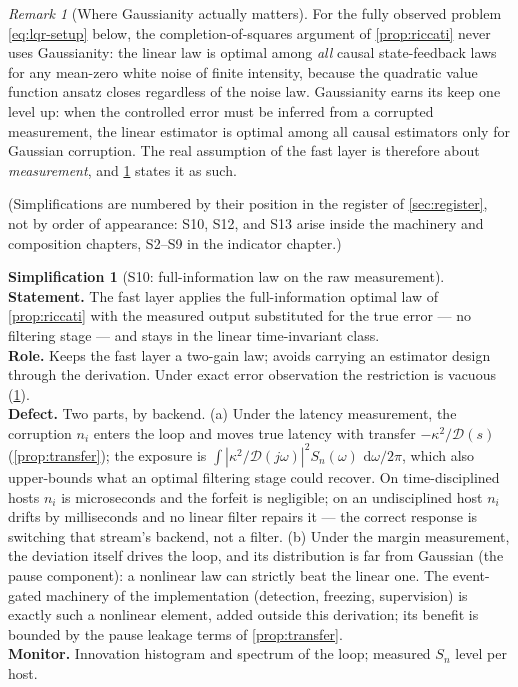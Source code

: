 \documentclass[11pt, a4paper]{article}
\theoremstyle{definition}
\newtheorem{simplification}{Simplification}
\theoremstyle{plain}
\theoremstyle{remark}
\newtheorem{remark}{Remark}[section]
\newcommand{\dd}{\,\mathrm{d}}
\begin{document}
\begin{remark}[Where Gaussianity actually matters]
\label{rem:gaussian-role}
For the fully observed problem \cref{eq:lqr-setup} below, the
completion-of-squares argument of \cref{prop:riccati} never uses
Gaussianity: the linear law is optimal among \emph{all} causal
state-feedback laws for any mean-zero white noise of finite intensity,
because the quadratic value function ansatz closes regardless of the
noise law.  Gaussianity earns its keep one level up: when the
controlled error must be inferred from a corrupted measurement, the
linear estimator is optimal among all causal estimators only for
Gaussian corruption.  The real assumption of the fast layer is
therefore about \emph{measurement}, and \cref{simp:gaussian} states it
as such.
\end{remark}

(Simplifications are numbered by their position in the register of
\cref{sec:register}, not by order of appearance: S10, S12, and S13
arise inside the machinery and composition chapters, S2--S9 in the
indicator chapter.)

\setcounter{simplification}{9}%
\begin{simplification}[S10: full-information law on the raw
measurement]\label{simp:gaussian}
\textbf{Statement.}  The fast layer applies the full-information
optimal law of \cref{prop:riccati} with the measured output
substituted for the true error --- no filtering stage --- and stays in
the linear time-invariant class.\\
\textbf{Role.}  Keeps the fast layer a two-gain law; avoids carrying
an estimator design through the derivation.  Under exact error
observation the restriction is vacuous (\cref{rem:gaussian-role}).\\
\textbf{Defect.}  Two parts, by backend.  (a) Under the latency
measurement, the corruption $n_i$ enters the loop and moves true
latency with transfer $-\kappa^2/\mathcal{D}(s)$
(\cref{prop:transfer}); the exposure is
$\int |\kappa^2/\mathcal{D}(j\omega)|^2 S_n(\omega)\,
\dd\omega/2\pi$, which also upper-bounds what an optimal filtering
stage could recover.  On time-disciplined hosts $n_i$ is microseconds
and the forfeit is negligible; on an undisciplined host $n_i$ drifts
by milliseconds and no linear filter repairs it --- the correct
response is switching that stream's backend, not a filter.  (b) Under
the margin measurement, the deviation itself drives the loop, and its
distribution is far from Gaussian (the pause component): a nonlinear
law can strictly beat the linear one.  The event-gated machinery of
the implementation (detection, freezing, supervision) is exactly such
a nonlinear element, added outside this derivation; its benefit is
bounded by the pause leakage terms of \cref{prop:transfer}.\\
\textbf{Monitor.}  Innovation histogram and spectrum of the loop;
measured $S_n$ level per host.
\end{simplification}
\end{document}
